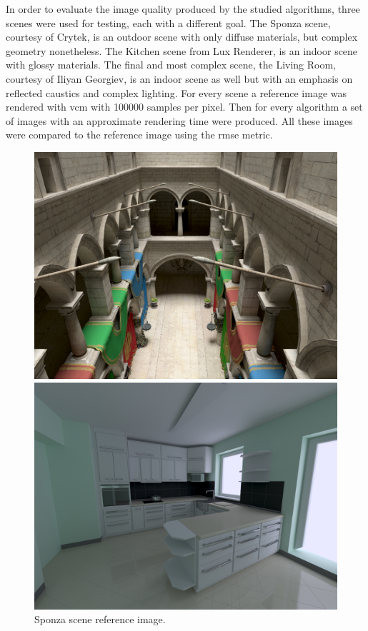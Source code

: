 In order to evaluate the image quality produced by the studied algorithms, three scenes were used for testing, each with a different goal. The Sponza scene, courtesy of Crytek, is an outdoor scene with only diffuse materials, but complex geometry nonetheless. The Kitchen scene from Lux Renderer, is an indoor scene with glossy materials. The final and most complex scene, the Living Room, courtesy of Iliyan Georgiev, is an indoor scene as well but with an emphasis on reflected caustics and complex lighting. For every scene a reference image was rendered with \gls{vcm} with 100000 samples per pixel. Then for every algorithm a set of images with an approximate rendering time were produced. All these images were compared to the reference image using the \gls{rmse} metric.

\begin{figure}[h]
\centering
\begin{minipage}[b]{0.3\linewidth}
\includegraphics[width=\linewidth]{img/sponza_ref.jpg}
\caption{\label{img:sponza_ref} Sponza scene reference image.}
\end{minipage}
\quad
\begin{minipage}[b]{0.3\linewidth}
\includegraphics[width=\linewidth]{img/kitchen_ref.jpg}

\end{minipage}
\end{figure}
